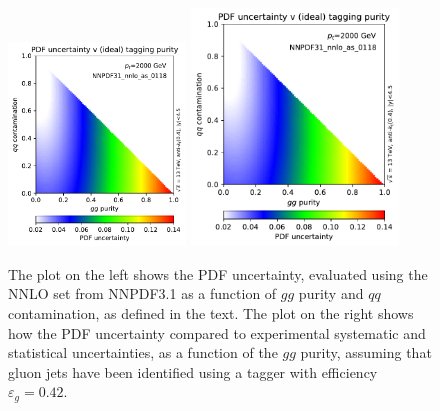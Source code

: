 \begin{figure}
\begin{center}
\includegraphics[width=0.42\textwidth, page=1]{figs/performance-plots.pdf} \hfill
\includegraphics[width=0.49\textwidth, page=2]{figs/performance-plots.pdf}
\caption{The plot on the left shows the PDF uncertainty, evaluated using the NNLO set from NNPDF3.1 as a function of $gg$ purity and $qq$ contamination, as defined in the text.
%
The plot on the right shows how the PDF uncertainty compared to experimental systematic and statistical uncertainties, as a function of the $gg$ purity, assuming that  gluon jets have been identified using a tagger with efficiency $\varepsilon_g=0.42$.}
\label{fig:pdf_unc_studies} 
\end{center}
\end{figure}

